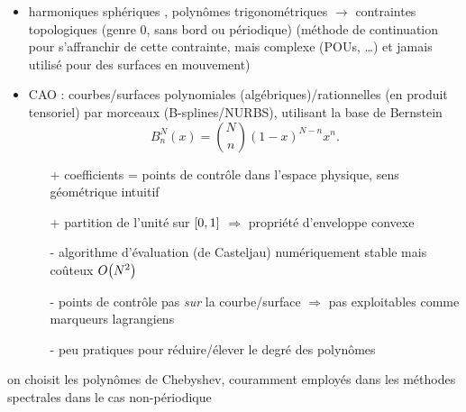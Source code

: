 \begin{itemize}
	\item harmoniques sphériques \cite{veerapaneni2011}, polynômes trigonométriques \cite{gueyffier2015} $\to$ contraintes topologiques (genre 0, sans bord ou périodique) (méthode de continuation \cite{bruno2007} pour s'affranchir de cette contrainte, mais complexe (POUs, \ldots) et jamais utilisé pour des surfaces en mouvement)
	\item CAO : courbes/surfaces polynomiales (algébriques)/rationnelles (en produit tensoriel) par morceaux (B-splines/NURBS), utilisant la base de Bernstein
	\begin{equation}
		B_n^N(x) = \binom{N}{n} \left( 1 - x \right)^{N-n} x^n.
	\end{equation}
	\begin{itemize}
		\item[+] coefficients = points de contrôle dans l'espace physique, sens géométrique intuitif
		\item[+] partition de l'unité sur $\left[ 0, 1 \right]$ $\Rightarrow$ propriété d'enveloppe convexe
		\item[-] algorithme d'évaluation (de Casteljau) numériquement stable mais coûteux $O\!\left( {N^2} \right)$
		\item[-] points de contrôle pas \emph{sur} la courbe/surface $\Rightarrow$ pas exploitables comme marqueurs lagrangiens
		\item[-] peu pratiques pour réduire/élever le degré des polynômes
	\end{itemize}
\end{itemize}
\bigskip
on choisit les polynômes de Chebyshev, couramment employés dans les méthodes spectrales dans le cas non-périodique
